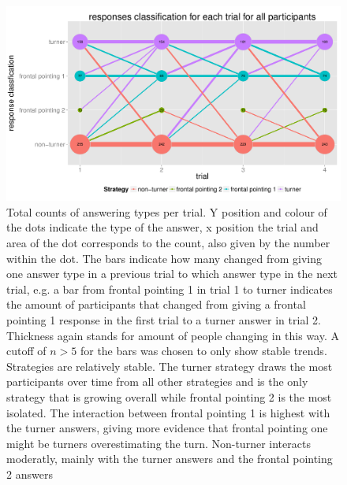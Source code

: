 \documentclass{frontiersSCNS} %
\begin{document}
\begin{figure}[h!]
  \centering
    \includegraphics[width=\textwidth]{figures/stratGraphAll.pdf}
   \caption{ \footnotesize Total counts of answering types per trial. Y position and colour of the dots indicate the type of the answer, x position the trial and area of the dot corresponds to the count, also given by the number within the dot. The bars indicate how many changed from giving one answer type in a previous trial to which answer type in the next trial, e.g. a bar from frontal pointing 1 in trial 1 to turner indicates the amount of participants that changed from giving a frontal pointing 1 response in the first trial to a turner answer in trial 2. Thickness again stands for amount of people changing in this way. A cutoff of $n>5$ for the bars was chosen to only show stable trends.
Strategies are relatively stable. The turner strategy draws the most participants over time from all other strategies and is the only strategy that is growing overall while frontal pointing 2 is the most isolated. The interaction between frontal pointing 1 is highest with the turner answers, giving more evidence that frontal pointing one might be turners overestimating the turn. Non-turner interacts moderatly, mainly with the turner answers and the frontal pointing 2 answers}
   \label{fig:stratGraphAll}
\end{figure}
\end{document}
